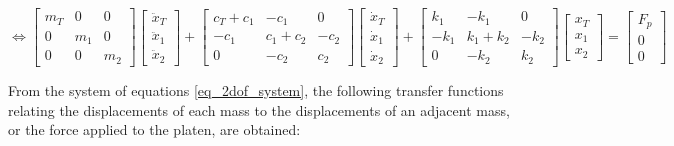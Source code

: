 \documentclass[  10pt, twoside]{report} %
\numberwithin{equation}{chapter}
\begin{document}
\begin{equation*}
\Longleftrightarrow
\begin{bmatrix}
    m_T & 0 & 0 \\
    0 & m_1 & 0 \\
    0 & 0 & m_2
\end{bmatrix}
\begin{bmatrix}
    \ddot{x}_T \\ \ddot{x}_1 \\ \ddot{x}_2
\end{bmatrix}
+
\begin{bmatrix}
    c_T + c_1 & -c_1 & 0 \\
    -c_1 & c_1 + c_2 & -c_2 \\
    0 & -c_2 & c_2
\end{bmatrix}
\begin{bmatrix}
    \dot{x}_T \\ \dot{x}_1 \\ \dot{x}_2
\end{bmatrix}
+
\begin{bmatrix}
    k_1 & -k_1 & 0 \\
    -k_1 & k_1 + k_2 & -k_2 \\
    0 & -k_2 & k_2
\end{bmatrix}
\begin{bmatrix}
    x_T \\ x_1 \\ x_2
\end{bmatrix}
=
\begin{bmatrix}
    F_p \\ 0 \\ 0
\end{bmatrix}
\end{equation*}
  
From the system of equations \eqref{eq_2dof_system}, the following transfer functions relating the displacements of each mass to the displacements of an adjacent mass, or the force applied to the platen, are obtained:
\end{document}
